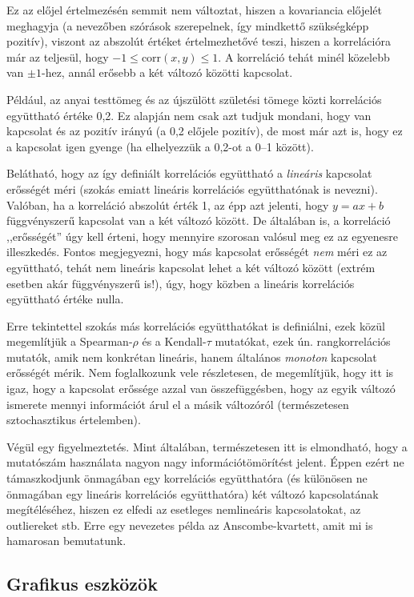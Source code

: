 \documentclass[]{book}
\begin{document}
Ez az előjel értelmezésén semmit nem változtat, hiszen a kovariancia
előjelét meghagyja (a nevezőben szórások szerepelnek, így mindkettő
szükségképp pozitív), viszont az abszolút értéket értelmezhetővé teszi,
hiszen a korrelációra már az teljesül, hogy
\(-1 \leq \mathrm{corr}\left(x,y\right) \leq 1\). A korreláció tehát
minél közelebb van \(\pm 1\)-hez, annál erősebb a két változó közötti
kapcsolat.

Például, az anyai testtömeg és az újszülött születési tömege közti
korrelációs együttható értéke 0,2. Ez alapján nem csak azt tudjuk
mondani, hogy van kapcsolat és az pozitív irányú (a 0,2 előjele
pozitív), de most már azt is, hogy ez a kapcsolat igen gyenge (ha
elhelyezzük a 0,2-ot a 0--1 között).

Belátható, hogy az így definiált korrelációs együttható a
\emph{lineáris} kapcsolat erősségét méri (szokás emiatt lineáris
korrelációs együtthatónak is nevezni). Valóban, ha a korreláció abszolút
érték 1, az épp azt jelenti, hogy \(y=ax+b\) függvényszerű kapcsolat van
a két változó között. De általában is, a korreláció ,,erősségét'' úgy
kell érteni, hogy mennyire szorosan valósul meg ez az egyenesre
illeszkedés. Fontos megjegyezni, hogy más kapcsolat erősségét \emph{nem}
méri ez az együttható, tehát nem lineáris kapcsolat lehet a két változó
között (extrém esetben akár függvényszerű is!), úgy, hogy közben a
lineáris korrelációs együttható értéke nulla.

Erre tekintettel szokás más korrelációs együtthatókat is definiálni,
ezek közül megemlítjük a Spearman-\(\rho\) és a Kendall-\(\tau\)
mutatókat, ezek ún. rangkorrelációs mutatók, amik nem konkrétan
lineáris, hanem általános \emph{monoton} kapcsolat erősségét mérik. Nem
foglalkozunk vele részletesen, de megemlítjük, hogy itt is igaz, hogy a
kapcsolat erőssége azzal van összefüggésben, hogy az egyik változó
ismerete mennyi információt árul el a másik változóról (természetesen
sztochasztikus értelemben).

Végül egy figyelmeztetés. Mint általában, természetesen itt is
elmondható, hogy a mutatószám használata nagyon nagy
információtömörítést jelent. Éppen ezért ne támaszkodjunk önmagában egy
korrelációs együtthatóra (és különösen ne önmagában egy lineáris
korrelációs együtthatóra) két változó kapcsolatának megítéléséhez,
hiszen ez elfedi az esetleges nemlineáris kapcsolatokat, az outliereket
stb. Erre egy nevezetes példa az Anscombe-kvartett, amit mi is hamarosan
bemutatunk.

\subsection{Grafikus eszközök}\label{deskriptivmennyketvaltvaltgrafikus}
\end{document}
